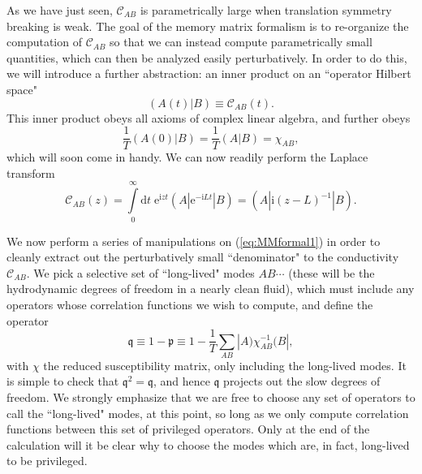 \documentclass[10pt, oneside]{book}
\begin{document}
\begin{doublespace}
As we have just seen, $\mathcal{C}_{AB}$ is parametrically large when translation symmetry breaking is weak.   The goal of the memory matrix formalism is to re-organize the computation of $\mathcal{C}_{AB}$ so that we can instead compute parametrically small quantities, which can then be analyzed easily perturbatively.   In order to do this, we will introduce a further abstraction:  an inner product on an ``operator Hilbert space" \begin{equation}
(A(t)|B) \equiv \mathcal{C}_{AB}(t).
\end{equation}
This inner product obeys all axioms of complex linear algebra, and further obeys \begin{equation}
\frac{1}{T}(A(0)|B) = \frac{1}{T}(A|B) = \chi_{AB},
\end{equation}
which will soon come in handy.   We can now readily perform the Laplace transform \begin{equation}
\mathcal{C}_{AB}(z) = \int\limits_0^\infty \mathrm{d}t\; \mathrm{e}^{\mathrm{i}zt} \left( A\left| \mathrm{e}^{-\mathrm{i}Lt}\right|B\right) = \left(A\left| \mathrm{i}(z-L)^{-1} \right|B\right).   \label{eq:MMformal1}
\end{equation}

We now perform a series of manipulations on (\ref{eq:MMformal1}) in order to cleanly extract out the perturbatively small ``denominator" to the conductivity $\mathcal{C}_{AB}$.    We pick a selective set of ``long-lived" modes $AB\cdots$ (these will be the hydrodynamic degrees of freedom in a nearly clean fluid), which must include any operators whose correlation functions we wish to compute, and define the operator \begin{equation}
\mathfrak{q} \equiv 1-\mathfrak{p} \equiv  1  -\frac{1}{T} \sum_{AB} |A)\chi^{-1}_{AB}(B|,
\end{equation} 
with $\chi$ the reduced susceptibility matrix, only including the long-lived modes.  It is simple to check that $\mathfrak{q}^2=\mathfrak{q}$, and hence $\mathfrak{q}$ projects out the slow degrees of freedom.   We strongly emphasize that we are free to choose any set of operators to call the ``long-lived" modes, at this point, so long as we only compute correlation functions between this set of privileged operators.  Only at the end of the calculation will it be clear why to choose the modes which are, in fact, long-lived to be privileged.


\end{doublespace}
\end{document}
